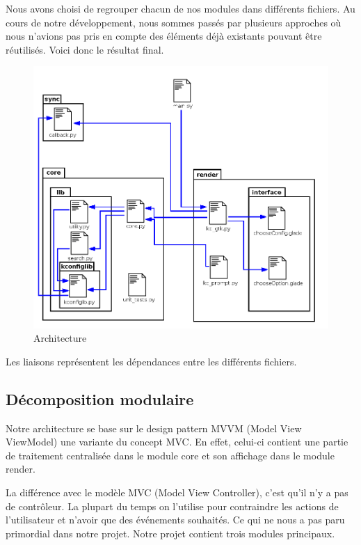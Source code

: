 \documentclass[16pts]{report}
\begin{document}
Nous avons choisi de regrouper chacun de nos modules dans différents fichiers.
Au cours de notre développement, nous sommes passés par plusieurs approches
où nous n'avions pas pris en compte des éléments déjà existants pouvant être
réutilisés. Voici donc le résultat final.
\begin{figure}[H]
    \includegraphics[scale=0.5]{illustrations/archi_add_v1.png}
    \centering
    \caption{Architecture}
    \label{fig:Arch}
\end{figure}

Les liaisons représentent les dépendances entre les différents fichiers.

\subsection{Décomposition modulaire}
\label{sec:Décomposition modulaire}
Notre architecture se base sur le design pattern MVVM (Model View
ViewModel) une variante du concept MVC. En effet, celui-ci contient une
partie de traitement centralisée dans le module core et son affichage dans
le module render.

La différence avec le modèle MVC (Model View Controller), c'est qu'il n'y a
pas de contrôleur.  La plupart du temps on l'utilise pour contraindre les
actions de l'utilisateur et n'avoir que des événements souhaités. Ce qui ne
nous a pas paru primordial dans notre projet.  Notre projet contient trois
modules principaux.
\end{document}
